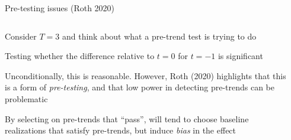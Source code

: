 \documentclass[notes,11pt, aspectratio=169]{beamer}
\newenvironment{wideitemize}{\itemize\addtolength{\itemsep}{10pt}}{\enditemize}
\begin{document}
\begin{frame}{Pre-testing issues (Roth 2020)}
  \begin{columns}[T] %
    \begin{column}{0.5\textwidth}
      \begin{wideitemize}
      \item Consider $T = 3$ and think about what a pre-trend test is
        trying to do
      \item Testing whether the difference relative to $t= 0$ for $t=-1$ is significant
      \item<3-> Unconditionally, this is reasonable. However, Roth
        (2020) highlights that this is a form of \emph{pre-testing},
        and that low power in detecting pre-trends can be problematic
      \item<5-> By selecting on pre-trends that ``pass'', will tend to
        choose baseline realizations that satisfy pre-trends, but
        induce \emph{bias} in the effect
      \end{wideitemize}
    \end{column}%
    \hfill%
    \begin{column}{.5\textwidth}

\end{column}
\end{columns}
\end{frame}
\end{document}
